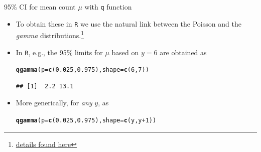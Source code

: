 \documentclass[10pt]{beamer}\usepackage[]{graphicx}\usepackage[]{color}
\makeatletter
\newcommand{\hlnum}[1]{\textcolor[rgb]{0.686,0.059,0.569}{#1}}%
\newcommand{\hlopt}[1]{\textcolor[rgb]{0,0,0}{#1}}%
\newcommand{\hlstd}[1]{\textcolor[rgb]{0.345,0.345,0.345}{#1}}%
\newcommand{\hlkwc}[1]{\textcolor[rgb]{0.333,0.667,0.333}{#1}}%
\newcommand{\hlkwd}[1]{\textcolor[rgb]{0.737,0.353,0.396}{\textbf{#1}}}%
\newenvironment{kframe}{%
 \def\at@end@of@kframe{}%
 \ifinner\ifhmode%
  \def\at@end@of@kframe{\end{minipage}}%
  \begin{minipage}{\columnwidth}%
 \fi\fi%
 \def\FrameCommand##1{\hskip\@totalleftmargin \hskip-\fboxsep
 \colorbox{shadecolor}{##1}\hskip-\fboxsep
     \hskip-\linewidth \hskip-\@totalleftmargin \hskip\columnwidth}%
 \MakeFramed {\advance\hsize-\width
   \@totalleftmargin\z@ \linewidth\hsize
   \@setminipage}}%
 {\par\unskip\endMakeFramed%
 \at@end@of@kframe}
\newenvironment{knitrout}{}{} %
\makeatother
\begin{document}
\begin{frame}[fragile]{95\% CI for mean count $\mu$ with \texttt{q} function}
	\begin{itemize}
		\setlength\itemsep{1em}
		\item To obtain these in \texttt{R}	we use the  natural link between the Poisson and  the \textit{gamma} 
		distributions.\footnote{
			{ \tiny \href{http://www.epi.mcgill.ca/hanley/bios601/Mean-Quantile/forAccromathBackTranslate.pdf}{details found here} }} 
		\item In \texttt{R}, e.g., the 95\% limits for $\mu$ based on $y=6$ are obtained as 
		
\begin{knitrout}\tiny
{}\color{fgcolor}\begin{kframe}
\begin{alltt}
\hlkwd{qgamma}\hlstd{(}\hlkwc{p} \hlstd{=} \hlkwd{c}\hlstd{(}\hlnum{0.025}\hlstd{,}\hlnum{0.975}\hlstd{),} \hlkwc{shape} \hlstd{=} \hlkwd{c}\hlstd{(}\hlnum{6}\hlstd{,} \hlnum{7}\hlstd{))}
\end{alltt}
\begin{verbatim}
## [1]  2.2 13.1
\end{verbatim}
\end{kframe}
\end{knitrout}
		
		\item More generically, for \textit{any} $y$, as
		
\begin{knitrout}\tiny
{}\color{fgcolor}\begin{kframe}
\begin{alltt}
\hlkwd{qgamma}\hlstd{(}\hlkwc{p} \hlstd{=} \hlkwd{c}\hlstd{(}\hlnum{0.025}\hlstd{,}\hlnum{0.975}\hlstd{),} \hlkwc{shape} \hlstd{=} \hlkwd{c}\hlstd{(y, y}\hlopt{+}\hlnum{1}\hlstd{))}
\end{alltt}
\end{kframe}
\end{knitrout}
		
	\end{itemize}
\end{frame}
\end{document}
